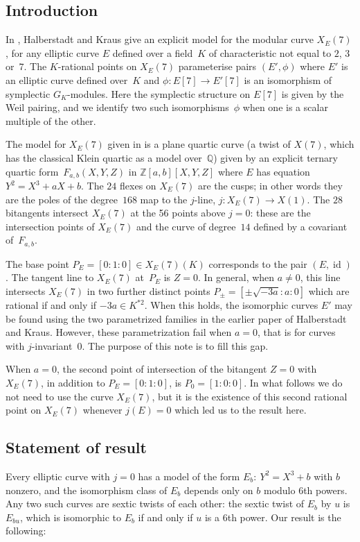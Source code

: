 \documentclass[12pt]{amsart}
\newcommand{\Q}{\mathbb{Q}}
\newcommand{\Z}{\mathbb{Z}}
\DeclareMathOperator{\id}{id}
\numberwithin{equation}{section}
\theoremstyle{definition}
\theoremstyle{remark}
\begin{document}
\subsection{Introduction}
In \cite{Halberstadt-Kraus-XE7}, Halberstadt and Kraus give an
explicit model for the modular curve $X_E(7)$, for any elliptic curve
$E$ defined over a field~$K$ of characteristic not equal to $2$, $3$
or~$7$. The $K$-rational points on $X_E(7)$ parameterise pairs
$(E',\phi)$ where $E'$ is an elliptic curve defined over~$K$ and
$\phi:E[7]\to E'[7]$ is an isomorphism of symplectic $G_K$-modules.
Here the symplectic structure on $E[7]$ is given by the Weil pairing,
and we identify two such isomorphisms~$\phi$ when one is a scalar
multiple of the other.

The model for $X_E(7)$ given in \cite{Halberstadt-Kraus-XE7} is a
plane quartic curve (a twist of $X(7)$, which has the classical Klein
quartic as a model over~$\Q$) given by an explicit ternary quartic
form~$F_{a,b}(X,Y,Z)$ in $\Z[a,b][X,Y,Z]$ where $E$ has equation
$Y^2=X^3+aX+b$.  The $24$ flexes on $X_E(7)$ are the cusps; in other
words they are the poles of the degree~$168$ map to the $j$-line, $j:
X_E(7)\to X(1)$.  The $28$ bitangents intersect $X_E(7)$ at the 56
points above $j=0$: these are the intersection points of $X_E(7)$ and
the curve of degree~$14$ defined by a covariant of~$F_{a,b}$.

The base point $P_E=[0:1:0]\in X_E(7)(K)$ corresponds to the pair
$(E,\id)$.  The tangent line to $X_E(7)$ at~$P_E$ is $Z=0$.  In
general, when $a\not=0$, this line intersects $X_E(7)$ in two further
distinct points $P_{\pm}=[\pm\sqrt{-3a}:a:0]$ which are rational if
and only if $-3a\in K^{*2}$.  When this holds, the isomorphic curves
$E'$ may be found using the two parametrized families in the earlier
paper \cite{Halberstadt-Kraus-YE7} of Halberstadt and Kraus.  However,
these parametrization fail when $a=0$, that is for curves with
$j$-invariant~$0$.  The purpose of this note is to fill this gap.

When $a=0$, the second point of intersection of the bitangent $Z=0$
with $X_E(7)$, in addition to $P_E=[0:1:0]$, is $P_0=[1:0:0]$.  In
what follows we do not need to use the curve $X_E(7)$, but it is the
existence of this second rational point on $X_E(7)$ whenever $j(E)=0$
which led us to the result here.

\subsection{Statement of result}
Every elliptic curve with $j=0$ has a model of the form
$E_b:\ Y^2=X^3+b$ with $b$ nonzero, and the isomorphism class of $E_b$
depends only on $b$ modulo $6$th powers.  Any two such curves are
sextic twists of each other: the sextic twist of $E_b$ by $u$ is
$E_{bu}$, which is isomorphic to $E_b$ if and only if $u$ is a $6$th
power.  Our result is the following:
\end{document}
